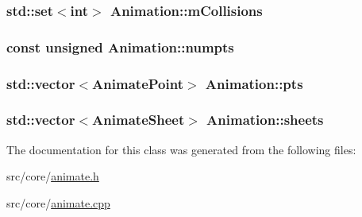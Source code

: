 \hypertarget{a00010_af39cf527a79753494729d7985126acde}{
\subsubsection[{m\-Collisions}]{\setlength{\rightskip}{0pt plus 5cm}std\-::set$<$int$>$ Animation\-::m\-Collisions\hspace{0.3cm}{\ttfamily [private]}}}\label{a00010_af39cf527a79753494729d7985126acde}
\hypertarget{a00010_acaf7f9a7901248baea8d8166b2808116}{
\subsubsection[{numpts}]{\setlength{\rightskip}{0pt plus 5cm}const unsigned Animation\-::numpts\hspace{0.3cm}{\ttfamily [private]}}}\label{a00010_acaf7f9a7901248baea8d8166b2808116}
\hypertarget{a00010_aa0df8c15f9b19dbe028c86dd4e2f6621}{
\subsubsection[{pts}]{\setlength{\rightskip}{0pt plus 5cm}std\-::vector$<${\bf Animate\-Point}$>$ Animation\-::pts\hspace{0.3cm}{\ttfamily [private]}}}\label{a00010_aa0df8c15f9b19dbe028c86dd4e2f6621}
\hypertarget{a00010_a6d138f4ed50295d2ef8c6d336df37324}{
\subsubsection[{sheets}]{\setlength{\rightskip}{0pt plus 5cm}std\-::vector$<${\bf Animate\-Sheet}$>$ Animation\-::sheets\hspace{0.3cm}{\ttfamily [private]}}}\label{a00010_a6d138f4ed50295d2ef8c6d336df37324}


The documentation for this class was generated from the following files\-:\begin{DoxyCompactItemize}
\item 
src/core/\hyperlink{a00195}{animate.\-h}\item 
src/core/\hyperlink{a00194}{animate.\-cpp}\end{DoxyCompactItemize}
